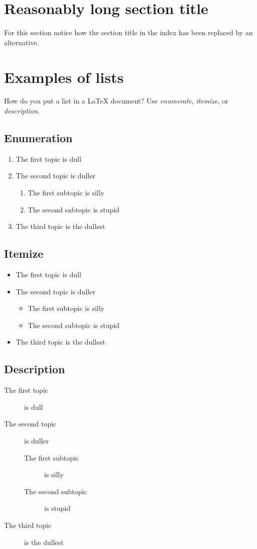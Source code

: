\section[Short title]{Reasonably long section title}

For this section notice how the section title in the index has been replaced by an alternative.

\section{Examples of lists}

How do you put a list in a \LaTeX{} document? Use \emph{enumerate}, \emph{itemize}, or \emph{description}.

\subsection*{Enumeration}
\begin{enumerate}
\item The first topic is dull
\item The second topic is duller
\begin{enumerate}
\item The first subtopic is silly
\item The second subtopic is stupid
\end{enumerate}
\item The third topic is the dullest
\end{enumerate}

\subsection*{Itemize}
\begin{itemize}
\item The first topic is dull
\item The second topic is duller
\begin{itemize}
\item The first subtopic is silly
\item The second subtopic is stupid
\end{itemize}
\item The third topic is the dullest
\end{itemize}

\subsection*{Description}
\begin{description}
\item[The first topic] is dull
\item[The second topic] is duller
\begin{description}
\item[The first subtopic] is silly
\item[The second subtopic] is stupid
\end{description}
\item[The third topic] is the dullest
\end{description}

